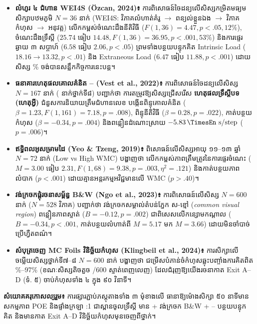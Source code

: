 \documentclass[a4paper,12pt]{article}
\newcommand{\en}[1]{{\TimesEn #1}}
\newcommand{\enit}[1]{{\TimesEn\textit{#1}}}
\newcommand{\unit}[1]{\,\text{\en{#1}}}
\newcommand{\cnum}[1]{{\TimesEn\fontsize{10.5pt}{12pt}\selectfont\ding{\numexpr181+#1\relax}}}
\begin{document}
\begin{itemize}[leftmargin=0.65cm]
  \item \textbf{លំហូរ ៤ ជំហាន \en{WEI4S (Özcan, 2024)}៖} ការពិសោធន៍ចៃដន្យលើសិស្សកម្រិតមធ្យមសិក្សាបឋមភូមិ \en{$N = 36$} នាក់ (\en{WEI4S}: វិភាគលំហាត់គំរូ $\to$ ពន្យល់ខ្លួនឯង $\to$ វិភាគកំហុស $\to$ អនុវត្ត) លើកកម្ពស់ចំណេះដឹងនីតិវិធី (\en{$F(1,36)=4.47, p<.05, 12\%$}), ចំណេះដឹងទ្រឹស្ដី (\en{$25.74$} ធៀប \en{$14.48, F(1,36)=36.95, p<.001, 53\%$}) និងការផ្ទេរឆ្ងាយ ៣ សប្ដាហ៍ (\en{$6.58$} ធៀប \en{$2.06, p<.05$}) ព្រមទាំងបន្ថយបន្ទុកគិត \en{Intrinsic Load ($18.16\to 13.32, p<.01$)} និង \en{Extraneous Load ($6.47$} ធៀប \en{$11.88, p<.001$)} ដោយសិស្ស \en{94.7\%} ចង់បានសន្លឹកកិច្ចការនេះបន្ត។
  \item \textbf{ធនាគារហេតុផលគោលគំនិត \cnum{1}--\cnum{5} (\en{Vest et al., 2022})៖} ការពិសោធន៍ចៃដន្យលើសិស្ស \en{$N = 167$} នាក់ (\en{36} នាក់ថ្នាក់ទី៨) បញ្ជាក់ថា ការតម្រូវឱ្យសិស្សជ្រើសរើស \textbf{ហេតុផលទ្រឹស្ដីបទ (ហេតុអ្វី)} ជំនួសការនិយាយត្រឹមជំហានលេខ បង្កើនពិន្ទុគោលគំនិត (\en{$\beta = 1.23, F(1,161)=7.18, p=.008$}), ពិន្ទុនីតិវិធី (\en{$\beta=0.28, p=.022$}), កាត់បន្ថយកំហុស (\en{$\beta=-0.34, p=.004$}) និងពន្លឿនដំណោះស្រាយ \en{$-5.83\unit{s/step}$ ($p=.006$)}។
  \item \textbf{ឥទ្ធិពលអូសម្រាមដៃ \en{[tracing] (Yeo \& Tzeng, 2019)}៖} ពិសោធន៍លើសិស្សអាយុ ១១--១៣ ឆ្នាំ \en{$N = 72$} នាក់ (\en{Low vs High WMC}) បង្ហាញថា \en{[tracing]} លើកកម្ពស់ភាពត្រឹមត្រូវនៃការផ្ទេរចំណេះ (\en{$M=3.00$} ធៀប \en{$2.31, F(1,68)=9.38, p=.003, \eta^2=.121$}) និងកាត់បន្ថយភាពលំបាក (\en{$p<.001$}) ដោយគ្មានអន្តរកម្មអវិជ្ជមានលើ \en{WMC} ($p>.40$)។
  \item \textbf{វង់ក្រចកផ្ដុំរចនាសម្ព័ន្ធ \en{B\&W (Ngo et al., 2023)}៖} ការពិសោធន៍លើសិស្ស \en{$N = 600$} នាក់ (\en{$N = 528$} វិភាគ) បញ្ជាក់ថា វង់ក្រចកសម្គាល់តំបន់ភ្នែក ស-ខ្មៅ (\enit{common visual region}) ពន្លឿនភាពស្ទាត់ (\en{$B=-0.12, p=.002$}) ជាពិសេសលើកន្សោមកណ្ដាល (\en{$B=-0.34, p<.001$}, កាត់បន្ថយលំហាត់ពី \en{$M=5.17$} មក \en{$M=3.66$}) ដោយមិនចាំបាច់ប្រើហ្វឺតពណ៌។
  \item \textbf{សំបុត្រចេញ \en{MC Foils} វិនិច្ឆ័យកំហុស (\en{Klingbeil et al., 2024})៖} ការសិក្សាលើចម្លើយសិស្សថ្នាក់ទី៧--៨ \en{$N = 600$} នាក់ បង្ហាញថា ជម្រើសបំភាន់ចំកំហុសឆ្លុះបញ្ចាំងការគិតពិត \en{92\%--97\%} (ខណៈសិស្សតិចតួច \en{11/600} ស្ទាត់ពេញលេញ) ដែលជំរុញឱ្យយើងរចនាកាត \en{Exit A--D} (ទំ. ៥) ចាប់កំហុសទាំង ៤ ក្នុង ៩០ វិនាទី។
\end{itemize}

\textbf{សំយោគគរុកោសល្យរួម៖} ការផ្សារភ្ជាប់ភស្តុតាងទាំង ៣ មុំខាងលើ ធានាឱ្យម៉ោងសិក្សា ៥០ នាទីមានសកម្មភាព \en{POE} និងផ្ទាំងក្រឡា \en{1:1} ជាស្ពានចូលទ្រឹស្ដី មាន \en{[tracing]} + វង់ក្រចក \en{B\&W} + \cnum{1}--\cnum{5} បន្ថយបន្ទុកគិត និងមានកាត \en{Exit A--D} វិនិច្ឆ័យកំហុសមុនចេញពីថ្នាក់។
\end{document}

